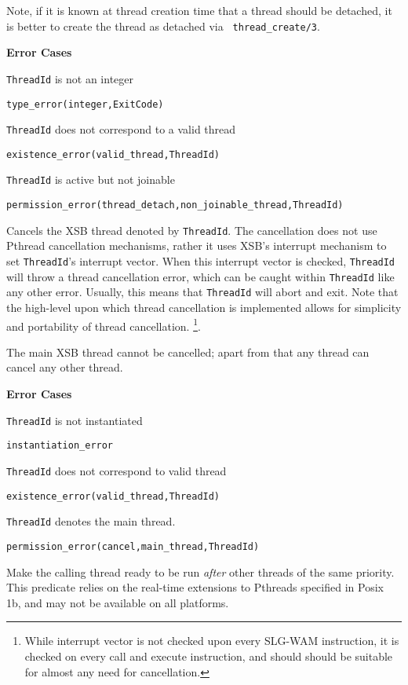 \begin{description}
Note, if it is known at thread creation time that a thread should be
detached, it is better to create the thread as detached via {\tt
  thread\_create/3}.

{\bf Error Cases}
\bi
\item 	{\tt ThreadId} is not an integer
\bi
\item 	{\tt type\_error(integer,ExitCode)}
\ei
\item   {\tt ThreadId} does not correspond to a valid thread
\bi
\item   {\tt existence\_error(valid\_thread,ThreadId)}
\ei
\item 	{\tt ThreadId} is active but not joinable
\bi
\item 	{\tt permission\_error(thread\_detach,non\_joinable\_thread,ThreadId)}
\ei
\ei

%
Cancels the XSB thread denoted by {\tt ThreadId}.  The cancellation
does not use Pthread cancellation mechanisms, rather it uses XSB's
interrupt mechanism to set {\tt ThreadId}'s interrupt vector.  When
this interrupt vector is checked, {\tt ThreadId} will throw a thread
cancellation error, which can be caught within {\tt ThreadId} like any
other error.  Usually, this means that {\tt ThreadId} will abort and
exit.  Note that the high-level upon which thread cancellation is
implemented allows for simplicity and portability of thread
cancellation.  \footnote{While interrupt vector is not checked upon
  every SLG-WAM instruction, it is checked on every {\sf call} and
  {\sf execute} instruction, and should should be suitable for almost
  any need for cancellation.}.

The main XSB thread cannot be cancelled; apart from that any thread
can cancel any other thread.

{\bf Error Cases}
\bi
\item 	{\tt ThreadId} is not instantiated
\bi
\item 	{\tt instantiation\_error}
\ei
%
\item   {\tt ThreadId} does not correspond to valid thread
\bi
\item   {\tt existence\_error(valid\_thread,ThreadId)}
\ei
\item   {\tt ThreadId} denotes the main thread.
\bi
\item   {\tt permission\_error(cancel,main\_thread,ThreadId)}
\ei
\ei

% 
Make the calling thread ready to be run {\em after} other threads of
the same priority.  This predicate relies on the real-time extensions
to Pthreads specified in Posix 1b, and may not be available on all
platforms.


\end{description}
